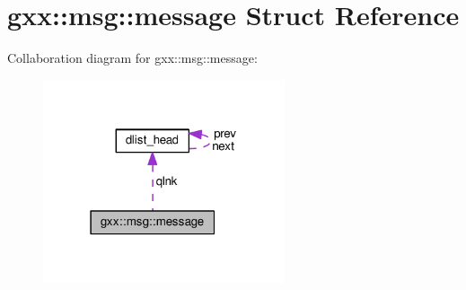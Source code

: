 \hypertarget{structgxx_1_1msg_1_1message}{}\section{gxx\+:\+:msg\+:\+:message Struct Reference}
\label{structgxx_1_1msg_1_1message}


Collaboration diagram for gxx\+:\+:msg\+:\+:message\+:
\nopagebreak
\begin{figure}[H]
\begin{center}
\leavevmode
\includegraphics[width=202pt]{structgxx_1_1msg_1_1message__coll__graph}
\end{center}
\end{figure}
